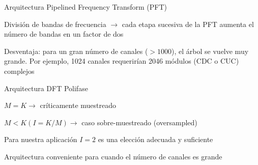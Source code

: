 \documentclass[ignorenonframetext,12pt]{beamer}
\begin{document}
\begin{frame}{Arquitectura Pipelined Frequency Transform (PFT)}
				\begin{center}
				\end{center}

				División de bandas de frecuencia $\to$ cada etapa sucesiva de la PFT
				aumenta el número de bandas en un factor de dos

				Desventaja: para un gran número de canales ($>1000$), el árbol se vuelve
				muy grande. Por ejemplo, 1024 canales requerirían 2046 módulos (CDC o
				CUC) complejos
\end{frame}

\begin{frame}{Arquitectura DFT Polifase}
				\begin{center}
				\end{center}

				$M = K \to$ críticamente muestreado

				$M < K (I = K/M) \to$ caso sobre-muestreado (oversampled)

				Para nuestra aplicación $I=2$ es una elección \alert{adecuada y
				suficiente}

				Arquitectura conveniente para cuando el número de canales es grande

\end{frame}
\end{document}

